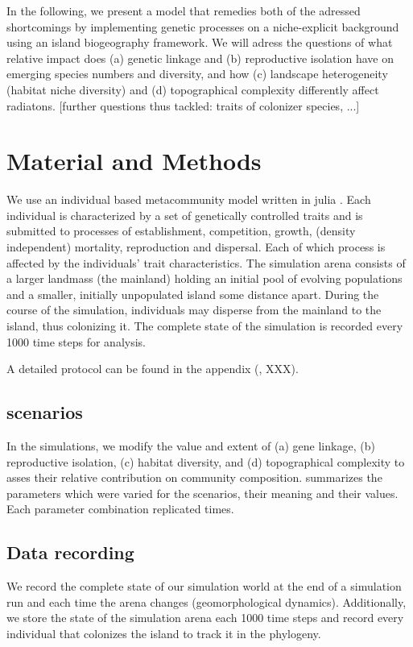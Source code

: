 \documentclass[a4paper]{scrartcl}
\begin{document}
In the following, we present a model that remedies both of the adressed shortcomings by implementing genetic processes on a niche-explicit background
using an island biogeography framework.
We will adress the questions of what relative impact does (a) genetic linkage and (b) reproductive isolation have on emerging species numbers and diversity,
and how (c) landscape heterogeneity (habitat niche diversity) and (d) topographical complexity differently affect radiatons.
[further questions thus tackled: traits of colonizer species, ...]




\section{Material and Methods}
We use an individual based metacommunity model written in julia \cite{JULIALANG}.
Each individual is characterized by a set of genetically controlled traits and is submitted to processes of
establishment, competition, growth, (density independent) mortality, reproduction and dispersal.
Each of which process is affected by the individuals' trait characteristics.
The simulation arena consists of a larger landmass (the mainland) holding an initial pool of evolving populations and a smaller, initially unpopulated island some distance apart.
During the course of the simulation, individuals may disperse from the mainland to the island, thus colonizing it.
The complete state of the simulation is recorded every 1000 time steps for analysis.

A detailed protocol can be found in the appendix (\cite{grimm2010odd}, XXX).

\subsection{scenarios}
In the simulations, we modify the value and extent of
(a) gene linkage,
(b) reproductive isolation,
(c) habitat diversity, and
(d) topographical complexity
to asses their relative contribution on community composition.
 summarizes the parameters which were varied for the scenarios, their meaning and their values. %
Each parameter combination replicated %
times.

\subsection{Data recording}
We record the complete state of our simulation world at the end of a simulation run and each time the arena changes (geomorphological dynamics).
Additionally, we store the state of the simulation arena each 1000 %
time steps and record every individual that colonizes the island to track it in the phylogeny.
\end{document}
